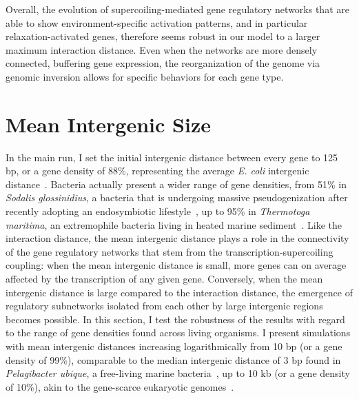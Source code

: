 Overall, the evolution of supercoiling-mediated gene regulatory networks that are able to show environment-specific activation patterns, and in particular relaxation-activated genes, therefore seems robust in our model to a larger maximum interaction distance.
Even when the networks are more densely connected, buffering gene expression, the reorganization of the genome via genomic inversion allows for specific behaviors for each gene type.


\section{Mean Intergenic Size}
\label{sec:param:mean-intergene}

In the main run, I set the initial intergenic distance between every gene to 125 bp, or a gene density of 88\%, representing the average \emph{E. coli} intergenic distance~\citep{postow2004}.
Bacteria actually present a wider range of gene densities, from 51\% in \emph{Sodalis glossinidius}, a bacteria that is undergoing massive pseudogenization after recently adopting an endosymbiotic lifestyle~\citep{toh2006}, up to 95\% in \emph{Thermotoga maritima}, an extremophile bacteria living in heated marine sediment~\citep{nelson1999}.
Like the interaction distance, the mean intergenic distance plays a role in the connectivity of the gene regulatory networks that stem from the transcription-supercoiling coupling: when the mean intergenic distance is small, more genes can on average affected by the transcription of any given gene.
Conversely, when the mean intergenic distance is large compared to the interaction distance, the emergence of regulatory subnetworks isolated from each other by large intergenic regions becomes possible.
In this section, I test the robustness of the results with regard to the range of gene densities found across living organisms.
I present simulations with mean intergenic distances increasing logarithmically from 10 bp (or a gene density of 99\%), comparable to the median intergenic distance of 3 bp found in \emph{Pelagibacter ubique}, a free-living marine bacteria~\citep{giovannoni2005}, up to 10 kb (or a gene density of 10\%), akin to the gene-scarce eukaryotic genomes~\citep{davilalopez2010}.

